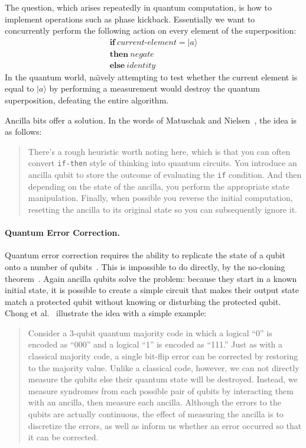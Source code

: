 \documentclass[sigplan,10pt,review,anonymous]{acmart}
\newcommand{\ket}[1]{|#1\rangle}
\begin{document}
The question, which arises repeatedly in quantum computation, is how
to implement operations such as phase kickback. Essentially we want to
concurrently perform the following action on every element of the
superposition:
\[\begin{array}{l}
  \textbf{if}~\textit{current-element}=\ket{a} \\
  \textbf{then}~\textit{negate} \\
  \textbf{else}~\textit{identity}
\end{array}\]
In the quantum world, na\"\i vely attempting to test whether the
current element is equal to $\ket{a}$ by performing a measurement would
destroy the quantum superposition, defeating the entire algorithm.

Ancilla bits offer a solution.  In the words of
Matuschak and Nielsen~\cite{howgrover}, the idea is as follows:
\begin{quote}
  There's a rough heuristic worth noting here, which is that you can
  often convert \verb|if-then| style of thinking into quantum
  circuits. You introduce an ancilla qubit to store the outcome of
  evaluating the \verb|if| condition. And then depending on the state
  of the ancilla, you perform the appropriate state
  manipulation. Finally, when possible you reverse the initial
  computation, resetting the ancilla to its original state so you can
  subsequently ignore it.
\end{quote}

\paragraph*{Quantum Error Correction.} 
Quantum error correction requires the ability to replicate the state of a
qubit onto a number of qubits~\cite[Ch.~3]{NAP25196}. This is
impossible to do directly, by the no-cloning theorem~\cite{XXX}. Again ancilla
qubits solve the problem: because they start in a known
initial state, it is possible to create a simple circuit that makes
their output state match a protected qubit without knowing or
disturbing the protected qubit. Chong et al.~\cite{sigarchblog}
illustrate the idea with a simple example:
\begin{quote}
Consider a 3-qubit quantum majority code in which a logical ``0'' is
encoded as ``000'' and a logical ``1'' is encoded as ``111.''  Just as with
a classical majority code, a single bit-flip error can be corrected by
restoring to the majority value.  Unlike a classical code, however, we
can not directly measure the qubits else their quantum state will be
destroyed.  Instead, we measure syndromes from each possible pair of
qubits by interacting them with an ancilla, then measure each ancilla.
Although the errors to the qubits are actually continuous, the effect
of measuring the ancilla is to discretize the errors, as well as
inform us whether an error occurred so that it can be corrected.  
\end{quote}
\end{document}
